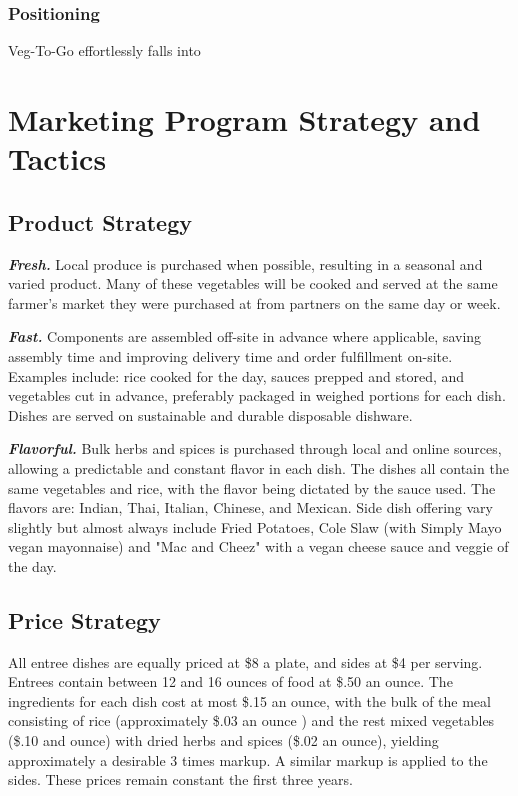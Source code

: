 \documentclass[12pt, letterpaper]{article}
\newcommand{\companyname}{Veg-To-Go}
\begin{document}
\subsubsection{Positioning}
\companyname{} effortlessly falls into

\section{Marketing Program Strategy and Tactics}
\subsection{Product Strategy}
\textbf{\emph{Fresh.}} Local produce is purchased when possible, resulting in a seasonal and varied product. Many of these vegetables will be cooked and served at the same farmer's market they were purchased at from partners on the same day or week.

\textbf{\emph{Fast.}} Components are assembled off-site in advance where applicable, saving assembly time and improving delivery time and order fulfillment on-site. Examples include: rice cooked for the day, sauces prepped and stored, and vegetables cut in advance, preferably packaged in weighed portions for each dish. Dishes are served on sustainable and durable disposable dishware.

\textbf{\emph{Flavorful.}} Bulk herbs and spices is purchased through local and online sources, allowing a predictable and constant flavor in each dish.  The dishes  all contain the same vegetables and rice, with the flavor being dictated by the sauce used.  The flavors are: Indian, Thai, Italian, Chinese, and Mexican. Side dish offering vary slightly but almost always include Fried Potatoes, Cole Slaw (with Simply Mayo\textregistered{} vegan mayonnaise) and "Mac and Cheez" with a vegan cheese sauce and veggie of the day.
\subsection{Price Strategy}
All entree dishes are equally priced at \$8 a plate, and sides at \$4 per serving. Entrees contain between 12 and 16 ounces of food at \$.50 an ounce. The ingredients for each dish cost at most \$.15 an ounce, with the bulk of the meal consisting of rice (approximately \$.03 an ounce \cite{costs}) and the rest mixed vegetables (\$.10 and ounce) with dried herbs and spices (\$.02 an ounce), yielding approximately a desirable 3 times markup. A similar markup is applied to the sides.  These prices remain constant the first three years.
\end{document}
